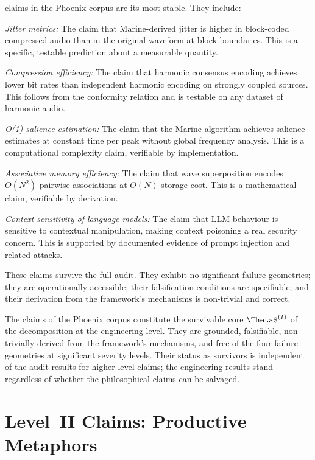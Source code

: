 \LevelI{} claims in the Phoenix corpus are its most
stable. They include:

\textit{Jitter metrics:} The claim that Marine-derived
jitter is higher in block-coded compressed audio than
in the original waveform at block boundaries. This is
a specific, testable prediction about a measurable
quantity.

\textit{Compression efficiency:} The claim that harmonic
consensus encoding achieves lower bit rates than
independent harmonic encoding on strongly coupled
sources. This follows from the conformity relation and
is testable on any dataset of harmonic audio.

\textit{O(1) salience estimation:} The claim that the
Marine algorithm achieves salience estimates at constant
time per peak without global frequency analysis. This
is a computational complexity claim, verifiable by
implementation.

\textit{Associative memory efficiency:} The claim that
wave superposition encodes $O(N^2)$ pairwise associations
at $O(N)$ storage cost. This is a mathematical claim,
verifiable by derivation.

\textit{Context sensitivity of language models:} The
claim that LLM behaviour is sensitive to contextual
manipulation, making context poisoning a real security
concern. This is supported by documented evidence of
prompt injection and related attacks.

These claims survive the full audit. They exhibit no
significant failure geometries; they are operationally
accessible; their falsification conditions are specifiable;
and their derivation from the framework's mechanisms
is non-trivial and correct.

\begin{auditprop}
\label{ap:level1-stable}
The \LevelI{} claims of the Phoenix corpus constitute
the survivable core $\ThetaS^{(I)}$ of the decomposition
at the engineering level. They are grounded, falsifiable,
non-trivially derived from the framework's mechanisms,
and free of the four failure geometries at significant
severity levels. Their status as survivors is independent
of the audit results for higher-level claims; the
engineering results stand regardless of whether the
philosophical claims can be salvaged.
\end{auditprop}

\section{Level~II Claims: Productive Metaphors}
\label{sec:level2-claims}

